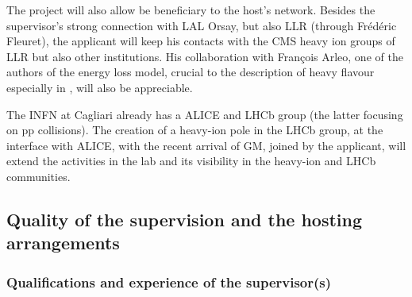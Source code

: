 \documentclass[a4paper,11pt]{article}
\begin{document}
The project will also allow be beneficiary to the host's network. Besides the supervisor's strong connection with LAL Orsay, but also LLR (through Frédéric Fleuret), the applicant will keep his contacts with the CMS heavy ion groups of LLR but also other institutions. His collaboration with François Arleo, one of the authors of the energy loss model, crucial to the description of heavy flavour especially in \ppb, will also be appreciable.

The INFN at Cagliari already has a ALICE and LHCb group (the latter focusing on pp collisions). The creation of a heavy-ion pole in the LHCb group, at the interface with ALICE, with the recent arrival of GM, joined by the applicant, will extend the activities in the lab and its visibility in the heavy-ion and LHCb communities.


%           

\subsection{Quality of the supervision and the hosting arrangements} 
\label{sec:supervision}

\subsubsection{Qualifications and experience of the supervisor(s)}

% 
\end{document}
